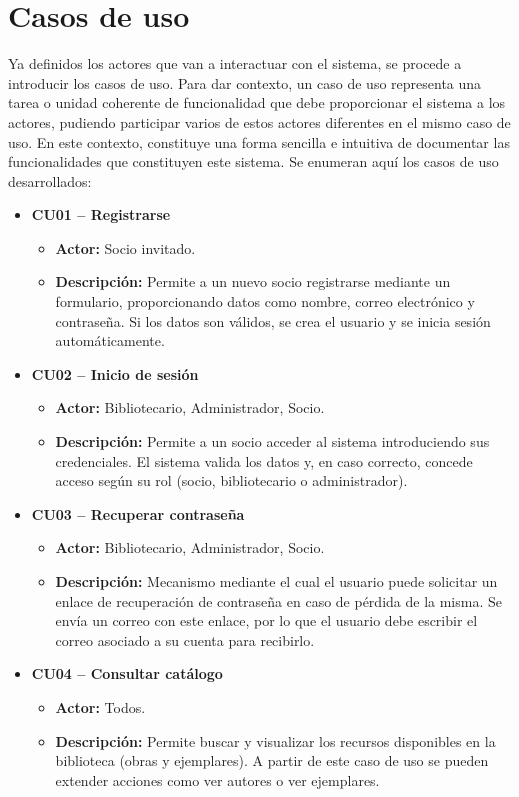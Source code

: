 \section{Casos de uso}
Ya definidos los actores que van a interactuar con el sistema, se procede a introducir los casos de uso.
Para dar contexto, un caso de uso representa una tarea o unidad coherente de funcionalidad que debe proporcionar el sistema a los actores, pudiendo participar varios de estos actores diferentes en el mismo caso de uso. En este contexto, constituye una forma sencilla e intuitiva de documentar las funcionalidades que constituyen este sistema.
Se enumeran aquí los casos de uso desarrollados:
\begin{itemize}
	\item \textbf{CU01 -- Registrarse}
	\begin{itemize}
		\item \textbf{Actor:} Socio invitado.
		\item \textbf{Descripción:} Permite a un nuevo socio registrarse mediante un formulario, proporcionando datos como nombre, correo electrónico y contraseña. Si los datos son válidos, se crea el usuario y se inicia sesión automáticamente.
	\end{itemize}
	
	\item \textbf{CU02 -- Inicio de sesión}
	\begin{itemize}
		\item \textbf{Actor:} Bibliotecario, Administrador, Socio.
		\item \textbf{Descripción:} Permite a un socio acceder al sistema introduciendo sus credenciales. El sistema valida los datos y, en caso correcto, concede acceso según su rol (socio, bibliotecario o administrador).
	\end{itemize}
		
	\item \textbf{CU03 -- Recuperar contraseña}
	\begin{itemize}
		\item \textbf{Actor:} Bibliotecario, Administrador, Socio.
		\item \textbf{Descripción:} Mecanismo mediante el cual el usuario puede solicitar un enlace de recuperación de contraseña en caso de pérdida de la misma. Se envía un correo con este enlace, por lo que el usuario debe escribir el correo asociado a su cuenta para recibirlo.
	\end{itemize}
		
	\item \textbf{CU04 -- Consultar catálogo}
	\begin{itemize}
		\item \textbf{Actor:} Todos.
		\item \textbf{Descripción:} Permite buscar y visualizar los recursos disponibles en la biblioteca (obras y ejemplares). A partir de este caso de uso se pueden extender acciones como ver autores o ver ejemplares.
	\end{itemize}
	

\end{itemize}
